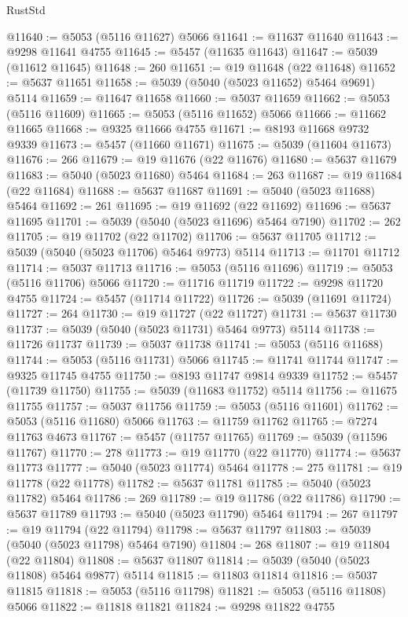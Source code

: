 \begin{lexlean}{RustStd}
\begin{coremodule}
@11640 := @5053 (@5116 @11627) @5066
@11641 := @11637 @11640
@11643 := @9298 @11641 @4755
@11645 := @5457 (@11635 @11643)
@11647 := @5039 (@11612 @11645)
@11648 := 260
@11651 := @19 @11648 (@22 @11648)
@11652 := @5637 @11651
@11658 := @5039 (@5040 (@5023 @11652) @5464 @9691) @5114
@11659 := @11647 @11658
@11660 := @5037 @11659
@11662 := @5053 (@5116 @11609)
@11665 := @5053 (@5116 @11652) @5066
@11666 := @11662 @11665
@11668 := @9325 @11666 @4755
@11671 := @8193 @11668 @9732 @9339
@11673 := @5457 (@11660 @11671)
@11675 := @5039 (@11604 @11673)
@11676 := 266
@11679 := @19 @11676 (@22 @11676)
@11680 := @5637 @11679
@11683 := @5040 (@5023 @11680) @5464
@11684 := 263
@11687 := @19 @11684 (@22 @11684)
@11688 := @5637 @11687
@11691 := @5040 (@5023 @11688) @5464
@11692 := 261
@11695 := @19 @11692 (@22 @11692)
@11696 := @5637 @11695
@11701 := @5039 (@5040 (@5023 @11696) @5464 @7190)
@11702 := 262
@11705 := @19 @11702 (@22 @11702)
@11706 := @5637 @11705
@11712 := @5039 (@5040 (@5023 @11706) @5464 @9773) @5114
@11713 := @11701 @11712
@11714 := @5037 @11713
@11716 := @5053 (@5116 @11696)
@11719 := @5053 (@5116 @11706) @5066
@11720 := @11716 @11719
@11722 := @9298 @11720 @4755
@11724 := @5457 (@11714 @11722)
@11726 := @5039 (@11691 @11724)
@11727 := 264
@11730 := @19 @11727 (@22 @11727)
@11731 := @5637 @11730
@11737 := @5039 (@5040 (@5023 @11731) @5464 @9773) @5114
@11738 := @11726 @11737
@11739 := @5037 @11738
@11741 := @5053 (@5116 @11688)
@11744 := @5053 (@5116 @11731) @5066
@11745 := @11741 @11744
@11747 := @9325 @11745 @4755
@11750 := @8193 @11747 @9814 @9339
@11752 := @5457 (@11739 @11750)
@11755 := @5039 (@11683 @11752) @5114
@11756 := @11675 @11755
@11757 := @5037 @11756
@11759 := @5053 (@5116 @11601)
@11762 := @5053 (@5116 @11680) @5066
@11763 := @11759 @11762
@11765 := @7274 @11763 @4673
@11767 := @5457 (@11757 @11765)
@11769 := @5039 (@11596 @11767)
@11770 := 278
@11773 := @19 @11770 (@22 @11770)
@11774 := @5637 @11773
@11777 := @5040 (@5023 @11774) @5464
@11778 := 275
@11781 := @19 @11778 (@22 @11778)
@11782 := @5637 @11781
@11785 := @5040 (@5023 @11782) @5464
@11786 := 269
@11789 := @19 @11786 (@22 @11786)
@11790 := @5637 @11789
@11793 := @5040 (@5023 @11790) @5464
@11794 := 267
@11797 := @19 @11794 (@22 @11794)
@11798 := @5637 @11797
@11803 := @5039 (@5040 (@5023 @11798) @5464 @7190)
@11804 := 268
@11807 := @19 @11804 (@22 @11804)
@11808 := @5637 @11807
@11814 := @5039 (@5040 (@5023 @11808) @5464 @9877) @5114
@11815 := @11803 @11814
@11816 := @5037 @11815
@11818 := @5053 (@5116 @11798)
@11821 := @5053 (@5116 @11808) @5066
@11822 := @11818 @11821
@11824 := @9298 @11822 @4755

\end{coremodule}
\end{lexlean}

